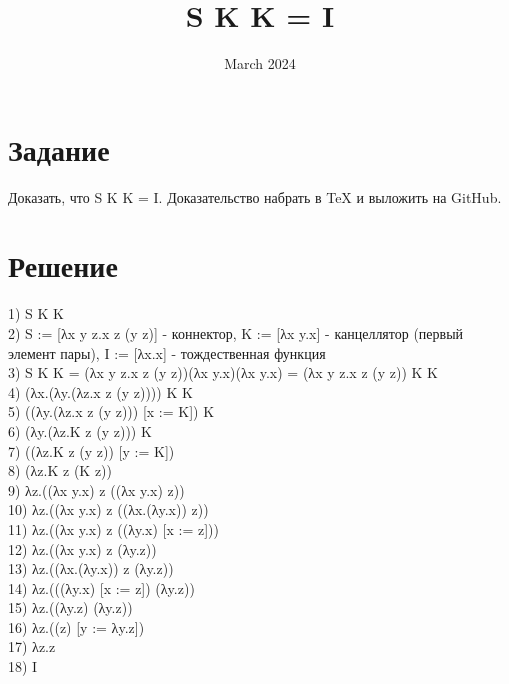 \documentclass{article}
\title{S K K = I}
\date{March 2024}
\begin{document}
\maketitle

\section{Задание}
Доказать, что S K K = I. Доказательство набрать в TeX и выложить на GitHub.
\section{Решение}
1) S K K \\
2) S := [λx y z.x z (y z)] - коннектор, K := [λx y.x] -  канцеллятор (первый элемент пары), I := [λx.x] - тождественная функция \\
3) S K K = (λx y z.x z (y z))(λx y.x)(λx y.x) = (λx y z.x z (y z)) K K \\
4) (λx.(λy.(λz.x z (y z)))) K K \\
5) ((λy.(λz.x z (y z))) [x := K]) K \\
6) (λy.(λz.K z (y z))) K \\
7) ((λz.K z (y z)) [y := K]) \\
8) (λz.K z (K z)) \\
9) λz.((λx y.x) z ((λx y.x) z)) \\
10) λz.((λx y.x) z ((λx.(λy.x)) z)) \\
11) λz.((λx y.x) z ((λy.x) [x := z])) \\
12) λz.((λx y.x) z (λy.z)) \\
13) λz.((λx.(λy.x)) z (λy.z)) \\ 
14) λz.(((λy.x) [x := z]) (λy.z)) \\
15) λz.((λy.z) (λy.z)) \\
16) λz.((z) [y := λy.z]) \\
17) λz.z \\
18) I
\end{document}
